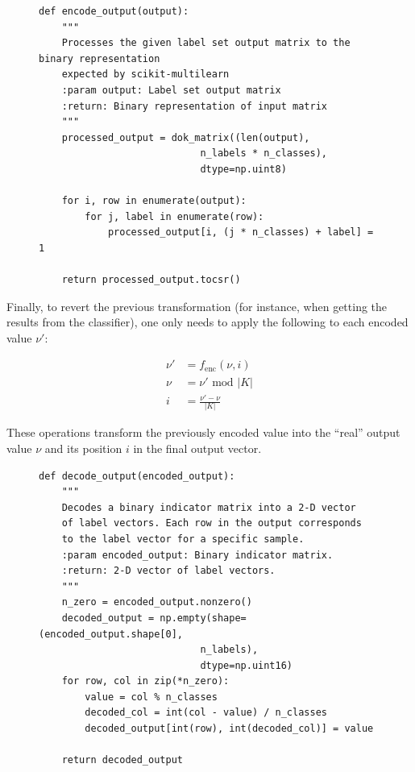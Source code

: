 \documentclass{kthreport}
\theoremstyle{definition}
\begin{document}
\begin{figure}[thb]
	\begin{lstlisting}[style=MyPython, caption={Encoding function in Python. This function both transforms the given output label matrix using $f_{\text{enc}}$ and encodes the result into a binary indicator matrix.}]
def encode_output(output):
	"""
	Processes the given label set output matrix to the binary representation
	expected by scikit-multilearn
	:param output: Label set output matrix
	:return: Binary representation of input matrix
	"""
	processed_output = dok_matrix((len(output), 
							n_labels * n_classes), 
							dtype=np.uint8)
	
	for i, row in enumerate(output):
		for j, label in enumerate(row):
			processed_output[i, (j * n_classes) + label] = 1
	
	return processed_output.tocsr()
		\end{lstlisting}
\end{figure}

Finally, to revert the previous transformation (for instance, when getting the results from the classifier), one only needs to apply the following to each encoded value $\nu'$:

\begin{align}
    \nu' &= f_{\text{enc}}(\nu, i)\\
    \nu &= \nu' \text{ mod } |K|\\
    i &= \frac{\nu' - \nu}{|K|}
\end{align}


These operations transform the previously encoded value into the ``real'' output value $\nu$ and its position $i$ in the final output vector.

\begin{figure}
	\begin{lstlisting}[style=MyPython, caption={Decoding function in Python, which takes a binary indicator matrix and extracts and decodes the encoded values within into the original data format.}, label={lst:decode}]
def decode_output(encoded_output):
	"""
	Decodes a binary indicator matrix into a 2-D vector 
	of label vectors. Each row in the output corresponds 
	to the label vector for a specific sample.
	:param encoded_output: Binary indicator matrix.
	:return: 2-D vector of label vectors.
	"""
	n_zero = encoded_output.nonzero()
	decoded_output = np.empty(shape=(encoded_output.shape[0],
							n_labels),
							dtype=np.uint16)
	for row, col in zip(*n_zero):
		value = col % n_classes
		decoded_col = int(col - value) / n_classes
		decoded_output[int(row), int(decoded_col)] = value
	
	return decoded_output
	\end{lstlisting}
\end{figure}
\end{document}
